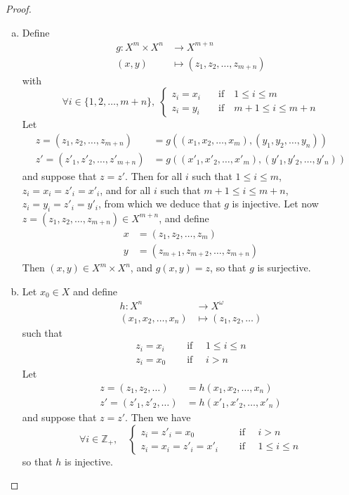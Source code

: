 \documentclass[11pt,a4paper,twoside]{article}
\theoremstyle{definition}
\begin{document}
\begin{proof}
\begin{enumerate}[(a)]
  \item Define
    \begin{align*}
      g : X^m \times X^n &\to X^{m + n} \\
      (x, y) &\mapsto (z_1, z_2, \dotsc, z_{m + n})
    \end{align*}
    with
    \begin{equation*}
      \forall i \in \{ 1, 2, \dotsc, m + n \}, \; \begin{cases}
        z_i = x_i \quad& \text{if} \quad 1 \leq i \leq m \\
        z_i = y_i \quad& \text{if} \quad m + 1 \leq i \leq m + n
      \end{cases}
    \end{equation*}
    Let
    \begin{align*}
      z = (z_1, z_2, \dotsc, z_{m + n}) &= g ((x_1, x_2, \dotsc, x_m), (y_1, y_2, \dotsc, y_n)) \\
      z' = (z'_1, z'_2, \dotsc, z'_{m + n}) &= g ((x'_1, x'_2, \dotsc, x'_m), (y'_1, y'_2, \dotsc, y'_n))
    \end{align*}
    and suppose that $z = z'$.
    Then for all $i$ such that $1 \leq i \leq m$, $z_i = x_i = z'_i = x'_i$,
    and for all $i$ such that $m + 1 \leq i \leq m + n$, $z_i = y_i = z'_i = y'_i$,
    from which we deduce that $g$ is injective.
    Let now $z = (z_1, z_2, \dotsc, z_{m + n}) \in X^{m + n}$, and define
    \begin{align*}
      x &= (z_1, z_2, \dotsc, z_m) \\
      y &= (z_{m + 1}, z_{m + 2}, \dotsc, z_{m + n})
    \end{align*}
    Then $(x, y) \in X^m \times X^n$, and $g (x, y) = z$, so that $g$ is surjective.

  \item Let $x_0 \in X$ and define
    \begin{align*}
      h : X^n &\to X^\omega \\
      (x_1, x_2, \dotsc, x_n) &\mapsto (z_1, z_2, \dotsc)
    \end{align*}
    such that
    \begin{align*}
      z_i = x_i &\quad\text{ if } \quad 1 \leq i \leq n \\
      z_i = x_0 &\quad\text{ if } \quad i > n
    \end{align*}
    Let
    \begin{align*}
      z = (z_1, z_2, \dotsc) &= h (x_1, x_2, \dotsc, x_n) \\
      z' = (z'_1, z'_2, \dotsc) &= h (x'_1, x'_2, \dotsc, x'_n)
    \end{align*}
    and suppose that $z = z'$. Then we have
    \begin{equation*}
      \forall i \in \mathbb{Z}_+, \quad \begin{cases}
        z_i = z'_i = x_0 &\quad\text{ if }\quad i > n \\
        z_i = x_i = z'_i = x'_i &\quad\text{ if }\quad 1 \leq i \leq n
      \end{cases}
    \end{equation*}
    so that $h$ is injective.


\end{enumerate}
\end{proof}
\end{document}
